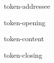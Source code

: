 \documentclass[version=last,a4paper,foldmarks=token-folding]{scrlttr2}
\begin{document}
\begin{letter}{token-addressee}
  \opening{token-opening}
  token-content
  \closing{token-closing}
\end{letter}
\end{document}
